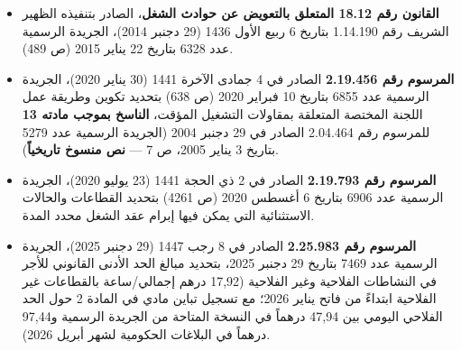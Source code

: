 \begin{itemize}[leftmargin=*, itemsep=5pt]
    \item \textbf{القانون رقم \textenglish{18.12} المتعلق بالتعويض عن حوادث الشغل}، الصادر بتنفيذه الظهير الشريف رقم \textenglish{1.14.190} بتاريخ \textenglish{6} ربيع الأول \textenglish{1436} (\textenglish{29} دجنبر \textenglish{2014})، الجريدة الرسمية عدد \textenglish{6328} بتاريخ \textenglish{22} يناير \textenglish{2015} (ص \textenglish{489}).
    \item \textbf{المرسوم رقم \textenglish{2.19.456}} الصادر في \textenglish{4} جمادى الآخرة \textenglish{1441} (\textenglish{30} يناير \textenglish{2020})، الجريدة الرسمية عدد \textenglish{6855} بتاريخ \textenglish{10} فبراير \textenglish{2020} (ص \textenglish{638}) بتحديد تكوين وطريقة عمل اللجنة المختصة المتعلقة بمقاولات التشغيل المؤقت، \textbf{الناسخ بموجب مادته \textenglish{13}} للمرسوم رقم \textenglish{2.04.464} الصادر في \textenglish{29} دجنبر \textenglish{2004} (الجريدة الرسمية عدد \textenglish{5279} بتاريخ \textenglish{3} يناير \textenglish{2005}، ص \textenglish{7} --- \textbf{نص منسوخ تاريخياً}).
    \item \textbf{المرسوم رقم \textenglish{2.19.793}} الصادر في \textenglish{2} ذي الحجة \textenglish{1441} (\textenglish{23} يوليو \textenglish{2020})، الجريدة الرسمية عدد \textenglish{6906} بتاريخ \textenglish{6} أغسطس \textenglish{2020} (ص \textenglish{4261}) بتحديد القطاعات والحالات الاستثنائية التي يمكن فيها إبرام عقد الشغل محدد المدة.
    \item \textbf{المرسوم رقم \textenglish{2.25.983}} الصادر في \textenglish{8} رجب \textenglish{1447} (\textenglish{29} دجنبر \textenglish{2025})، الجريدة الرسمية عدد \textenglish{7469} بتاريخ \textenglish{29} دجنبر \textenglish{2025}، بتحديد مبالغ الحد الأدنى القانوني للأجر في النشاطات الفلاحية وغير الفلاحية (\textenglish{17,92} درهم إجمالي/ساعة بالقطاعات غير الفلاحية ابتداءً من فاتح يناير \textenglish{2026}؛ مع تسجيل تباين مادي في المادة \textenglish{2} حول الحد الفلاحي اليومي بين \textenglish{47,94} درهماً في النسخة المتاحة من الجريدة الرسمية و\textenglish{97,44} درهماً في البلاغات الحكومية لشهر أبريل \textenglish{2026}).
\end{itemize}

